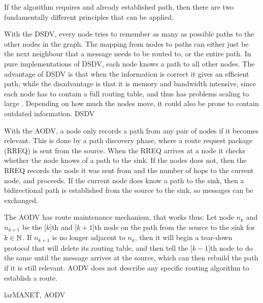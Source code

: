 If the algorithm requires and already established path, then there are two fundamentally different principles that can be applied.
\begin{description}
{With the DSDV, every node tries to remember as many as possible paths to the other nodes in the graph. The mapping from nodes to paths can either just be the next neighbour that a message needs to be routed to, or the entire path. In pure implementations of DSDV, each node knows a path to all other nodes. The advantage of DSDV is that when the information is correct it gives an efficient path, while the disadvantage is that it is memory and bandwidth intensive, since each node has to contain a full routing table, and thus has problems scaling to large \manet. Depending on how much the nodes move, it could also be prone to contain outdated information.
}
{DSDV}

{With the AODV, a node only records a path from any pair of nodes if it becomes relevant. This is done by a path discovery phase, where a route request package (RREQ) is sent from the source. When the RREQ arrives at a node it checks whether the node knows of a path to the sink. If the nodes does not, then the RREQ records the node it was sent from and the number of hops to the current node, and proceeds. If the current node does know a path to the sink, then a bidirectional path is established from the source to the sink, so messages can be exchanged.

The AODV has route maintenance mechanism, that works thus: Let node $n_k$ and $n_{k+1}$ be the [$k$]th and [$k+1$]th node on the path from the source to the sink for $k \in \mathbb{N}$. If $n_{k+1}$ is no longer adjacent to $n_{k}$, then it will begin a tear-down protocol that will delete its routing table, and then tell the [$k-1$]th node to do the same until the message arrives at the source, which can then rebuild the path if it is still relevant.
AODV does not describe any specific routing algorithm to establish a route.}
{larMANET, AODV}

\end{description}


